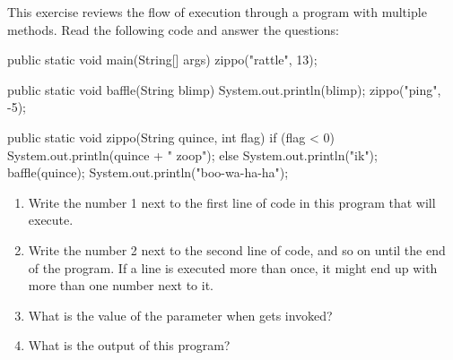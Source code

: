 \begin{exercise}  %

This exercise reviews the flow of execution through a program with multiple methods.
Read the following code and answer the questions:

\begin{code}
public static void main(String[] args) {
    zippo("rattle", 13);
}
\end{code}

\begin{code}
public static void baffle(String blimp) {
    System.out.println(blimp);
    zippo("ping", -5);
}
\end{code}

\begin{code}
public static void zippo(String quince, int flag) {
    if (flag < 0) {
        System.out.println(quince + " zoop");
    } else {
        System.out.println("ik");
        baffle(quince);
        System.out.println("boo-wa-ha-ha");
    }
}
\end{code}

\begin{enumerate}

\item Write the number 1 next to the first line of code in this program that will execute.

\item Write the number 2 next to the second line of code, and so on until the end of the program.
If a line is executed more than once, it might end up with more than one number next to it.

\item What is the value of the parameter  when  gets invoked?

\item What is the output of this program?

\end{enumerate}

\end{exercise}


